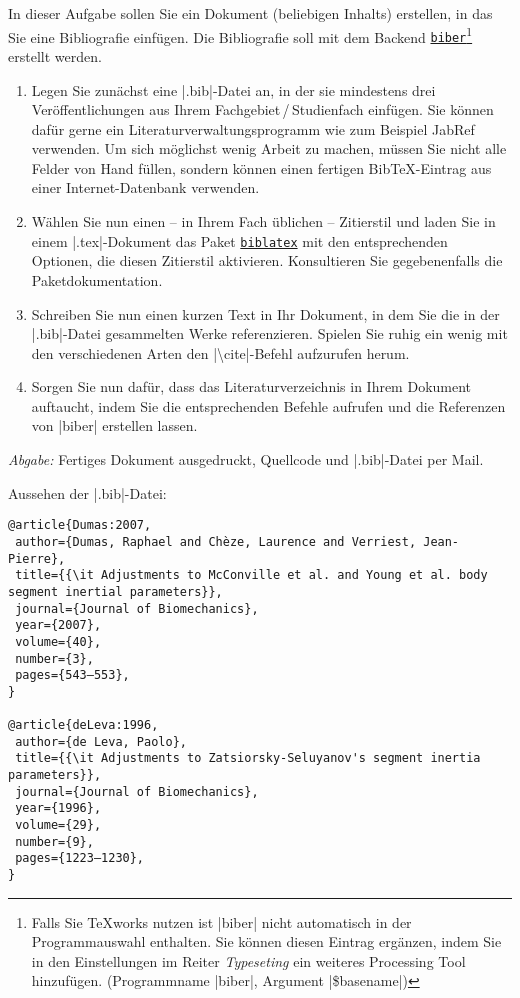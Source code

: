 \documentclass{scrartcl}
\newcommand{\abgabe}[1]{\par\noindent\textit{Abgabe:} #1}
\newcommand{\pkg}[1]{\href{http://ctan.org/pkg/#1}{\texttt{#1}}}
\begin{document}
\begin{question}[subtitle=Bibliografien mit \pkg{biblatex}]{6}
	In dieser Aufgabe sollen Sie ein Dokument (beliebigen Inhalts) erstellen, in das Sie eine Bibliografie einfügen. Die Bibliografie soll mit dem Backend \pkg{biber}\footnote{Falls Sie \TeX works nutzen ist |biber| nicht automatisch in der Programmauswahl enthalten. Sie können diesen Eintrag ergänzen, indem Sie in den Einstellungen im Reiter \emph{Typeseting} ein weiteres Processing Tool hinzufügen. (Programmname |biber|, Argument |\$basename|)} erstellt werden. 
\begin{enumerate}[label=\alph*)]
	\item Legen Sie zunächst eine |.bib|-Datei an, in der sie mindestens drei Veröffentlichungen aus Ihrem Fachgebiet\,/\,Studienfach einfügen. Sie können dafür gerne ein Literaturverwaltungsprogramm wie zum Beispiel JabRef verwenden. Um sich möglichst wenig Arbeit zu machen, müssen Sie nicht alle Felder von Hand füllen, sondern können einen fertigen BibTeX-Eintrag aus einer Internet-Datenbank verwenden.
	\item Wählen Sie nun einen – in Ihrem Fach üblichen – Zitierstil und laden Sie in einem |.tex|-Dokument das Paket \pkg{biblatex} mit den entsprechenden Optionen, die diesen Zitierstil aktivieren. Konsultieren Sie gegebenenfalls die Paketdokumentation.
	\item Schreiben Sie nun einen kurzen Text in Ihr Dokument, in dem Sie die in der |.bib|-Datei gesammelten Werke referenzieren. Spielen Sie ruhig ein wenig mit den verschiedenen Arten den |\textbackslash cite|-Befehl aufzurufen herum.
	\item Sorgen Sie nun dafür, dass das Literaturverzeichnis in Ihrem Dokument auftaucht, indem Sie die entsprechenden Befehle aufrufen und die Referenzen von |biber| erstellen lassen.
\end{enumerate}
	\abgabe{Fertiges Dokument ausgedruckt, Quellcode und |.bib|-Datei per Mail.}
\end{question}


\newsavebox{\SolutionCodeA}
\begin{lrbox}{\SolutionCodeA}
\begin{minipage}{\textwidth}
Aussehen der |.bib|-Datei:
\begin{lstlisting}
@article{Dumas:2007,
 author={Dumas, Raphael and Chèze, Laurence and Verriest, Jean-Pierre},
 title={{\it Adjustments to McConville et al. and Young et al. body segment inertial parameters}},
 journal={Journal of Biomechanics},
 year={2007},
 volume={40},
 number={3},
 pages={543–553},
}

@article{deLeva:1996,
 author={de Leva, Paolo},
 title={{\it Adjustments to Zatsiorsky-Seluyanov's segment inertia parameters}},
 journal={Journal of Biomechanics},
 year={1996},
 volume={29},
 number={9},
 pages={1223–1230},
}
\end{lstlisting}
\end{minipage}
\end{lrbox}
\end{document}
